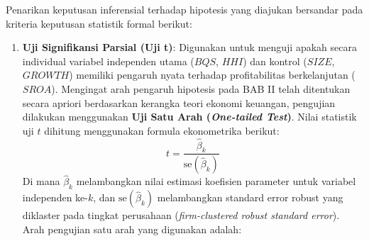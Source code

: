 \documentclass[12pt,a4paper]{article}
\begin{document}
Penarikan keputusan inferensial terhadap hipotesis yang diajukan
bersandar pada kriteria keputusan statistik formal berikut:

\begin{enumerate}
\def\labelenumi{\arabic{enumi}.}
\item
  \textbf{Uji Signifikansi Parsial (Uji t)}: Digunakan untuk menguji
  apakah secara individual variabel independen utama (\(BQS\), \(HHI\))
  dan kontrol (\(SIZE\), \(GROWTH\)) memiliki pengaruh nyata terhadap
  profitabilitas berkelanjutan (\(SROA\)). Mengingat arah pengaruh
  hipotesis pada BAB II telah ditentukan secara apriori berdasarkan
  kerangka teori ekonomi keuangan, pengujian dilakukan menggunakan
  \textbf{Uji Satu Arah (\emph{One-tailed Test})}. Nilai statistik uji
  \(t\) dihitung menggunakan formula ekonometrika berikut:
  \begin{equation}
  t = \frac{\hat{\beta}_k}{\mathrm{se}(\hat{\beta}_k)}
  \end{equation} Di mana \(\hat{\beta}_k\) melambangkan nilai estimasi
  koefisien parameter untuk variabel independen ke-\(k\), dan
  \(\mathrm{se}(\hat{\beta}_k)\) melambangkan standard error robust yang
  diklaster pada tingkat perusahaan (\emph{firm-clustered robust
  standard error}). Arah pengujian satu arah yang digunakan adalah:


\end{enumerate}
\end{document}
